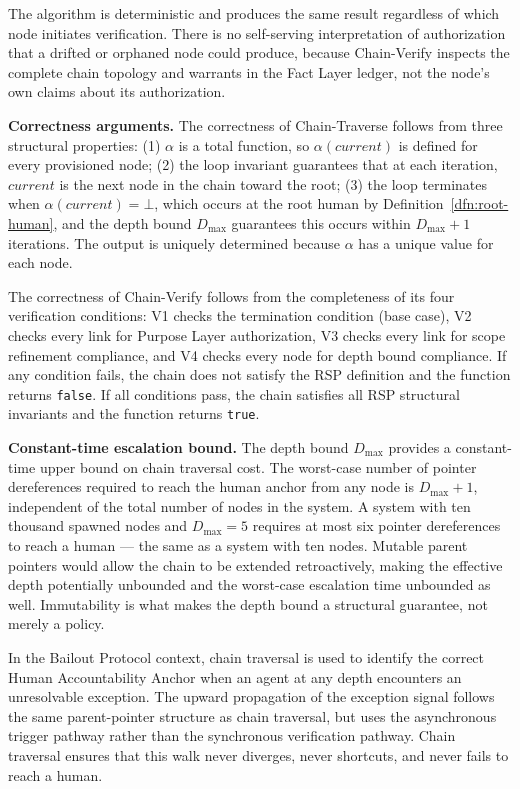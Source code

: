 The algorithm is deterministic and produces the same result regardless of which node initiates verification. There is no self-serving interpretation of authorization that a drifted or orphaned node could produce, because Chain-Verify inspects the complete chain topology and warrants in the Fact Layer ledger, not the node's own claims about its authorization.

\medskip
\noindent\textbf{Correctness arguments.} The correctness of Chain-Traverse follows from three structural properties: (1) $\alpha$ is a total function, so $\alpha(current)$ is defined for every provisioned node; (2) the loop invariant guarantees that at each iteration, $current$ is the next node in the chain toward the root; (3) the loop terminates when $\alpha(current) = \bot$, which occurs at the root human by Definition~\ref{dfn:root-human}, and the depth bound $D_{\max}$ guarantees this occurs within $D_{\max} + 1$ iterations. The output is uniquely determined because $\alpha$ has a unique value for each node.

The correctness of Chain-Verify follows from the completeness of its four verification conditions: V1 checks the termination condition (base case), V2 checks every link for Purpose Layer authorization, V3 checks every link for scope refinement compliance, and V4 checks every node for depth bound compliance. If any condition fails, the chain does not satisfy the RSP definition and the function returns \texttt{false}. If all conditions pass, the chain satisfies all RSP structural invariants and the function returns \texttt{true}.

\medskip
\noindent\textbf{Constant-time escalation bound.} The depth bound $D_{\max}$ provides a constant-time upper bound on chain traversal cost. The worst-case number of pointer dereferences required to reach the human anchor from any node is $D_{\max} + 1$, independent of the total number of nodes in the system. A system with ten thousand spawned nodes and $D_{\max} = 5$ requires at most six pointer dereferences to reach a human --- the same as a system with ten nodes. Mutable parent pointers would allow the chain to be extended retroactively, making the effective depth potentially unbounded and the worst-case escalation time unbounded as well. Immutability is what makes the depth bound a structural guarantee, not merely a policy.

In the Bailout Protocol context, chain traversal is used to identify the correct Human Accountability Anchor when an agent at any depth encounters an unresolvable exception. The upward propagation of the exception signal follows the same parent-pointer structure as chain traversal, but uses the asynchronous trigger pathway rather than the synchronous verification pathway. Chain traversal ensures that this walk never diverges, never shortcuts, and never fails to reach a human.

